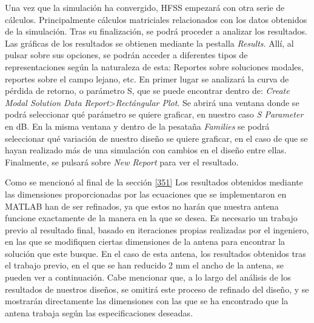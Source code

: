 \par Una vez que la simulación ha convergido, HFSS empezará con otra serie de cálculos. Principalmente cálculos matriciales relacionados con los datos obtenidos de la simulación. Tras su finalización, se podrá proceder a analizar los resultados. Las gráficas de los resultados se obtienen mediante la pestalla \textit{Results}. Allí, al pulsar sobre sus opciones, se podrán acceder a diferentes tipos de representaciones según la naturaleza de esta: Reportes sobre soluciones modales, reportes sobre el campo lejano, etc. En primer lugar se analizará la curva de pérdida de retorno, o parámetro S, que se puede encontrar dentro de: \textit{Create Modal Solution Data Report}>\textit{Rectángular Plot}. Se abrirá una ventana donde se podrá seleccionar qué parámetro se quiere graficar, en nuestro caso \textit{S Parameter} en dB. En la misma ventana y dentro de la pesataña \textit{Families} se podrá seleccionar qué variación de nuestro diseño se quiere graficar, en el caso de que se hayan realizado más de una simulación con cambios en el diseño entre ellas. Finalmente, se pulsará sobre \textit{New Report} para ver el resultado.
\\
\par Como se mencionó al final de la sección \ref{351} Los resultados obtenidos mediante las dimensiones proporcionadas por las ecuaciones que se implementaron en MATLAB han de ser refinados, ya que estos no harán que nuestra antena funcione exactamente de la manera en la que se desea. Es necesario un trabajo previo al resultado final, basado en iteraciones propias realizadas por el ingeniero, en las que se modifiquen ciertas dimensiones de la antena para encontrar la solución que este busque. En el caso de esta antena, los resultados obtenidos tras el trabajo previo, en el que se han reducido 2 mm el ancho de la antena, se pueden ver a continuación. Cabe mencionar que, a lo largo del análisis de los resultados de nuestros diseños, se omitirá este proceso de refinado del diseño, y se mostrarán directamente las dimensiones con las que se ha encontrado que la antena trabaja según las especificaciones deseadas.
\\
